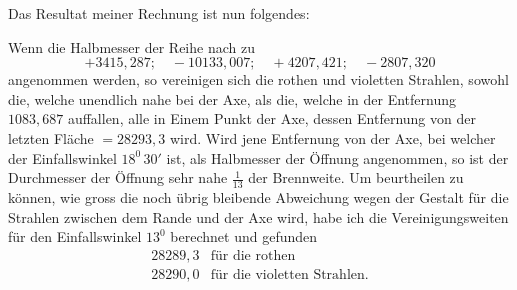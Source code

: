 Das Resultat meiner Rechnung ist nun folgendes:

Wenn die Halbmesser der Reihe nach zu
\[
+3415{,}287;\quad -10133{,}007;\quad +4207{,}421;\quad -2807{,}320
\]
angenommen werden, so vereinigen sich die rothen und violetten Strahlen, sowohl die, welche unendlich nahe bei der Axe, als die, welche in der Entfernung $1083{,}687$ auffallen, alle in Einem Punkt der Axe, dessen Entfernung von der letzten Fläche $=28293{,}3$ wird. Wird jene Entfernung von der Axe, bei welcher der Einfallswinkel $18^0\,30'$ ist, als Halbmesser der Öffnung angenommen, so ist der Durchmesser der Öffnung sehr nahe $\tfrac{1}{13}$ der Brennweite. Um beurtheilen zu können, wie gross die noch übrig bleibende Abweichung wegen der Gestalt für die Strahlen zwischen dem Rande und der Axe wird, habe ich die Vereinigungsweiten für den Einfallswinkel $13^0$ berechnet und gefunden
\[
\begin{array}{ll}
28289{,}3&\text{für die rothen}\\
28290{,}0&\text{für die violetten Strahlen.}
\end{array}
\]

